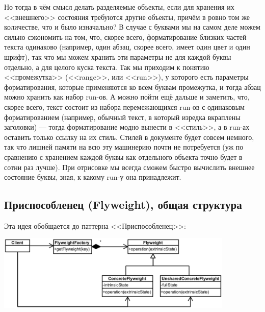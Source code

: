 \documentclass[a5paper]{article}
\begin{document}
Но тогда в чём смысл делать разделяемые объекты, если для хранения их <<внешнего>> состояния требуются другие объекты, причём в ровно том же количестве, что и было изначально? В случае с буквами мы на самом деле можем сильно сэкономить на том, что, скорее всего, форматирование близких частей текста одинаково (например, один абзац, скорее всего, имеет один цвет и один шрифт), так что мы можем хранить эти параметры не для каждой буквы отдельно, а для целого куска текста. Так мы приходим к понятию <<промежутка>> (<<range>>, или <<run>>), у которого есть параметры форматирования, которые применяются ко всем буквам промежутка, и тогда абзац можно хранить как набор run-ов. А можно пойти ещё дальше и заметить, что, скорее всего, текст состоит из набора перемежающихся run-ов с одинаковым форматированием (например, обычный текст, в который изредка вкраплены заголовки) --- тогда форматирование модно вынести в <<стиль>>, а в run-ах оставить только ссылку на их стиль. Стилей в документе будет совсем немного, так что лишней памяти на всю эту машинерию почти не потребуется (уж по сравнению с хранением каждой буквы как отдельного объекта точно будет в сотни раз лучше). При отрисовке мы всегда сможем быстро вычислить внешнее состояние буквы, зная, к какому run-у она принадлежит.

\subsection{Приспособленец (Flyweight), общая структура}

Эта идея обобщается до паттерна <<Приспособленец>>:

\begin{center}
    \includegraphics[width=0.85\textwidth]{flyweight.png}
\end{center}
\end{document}
